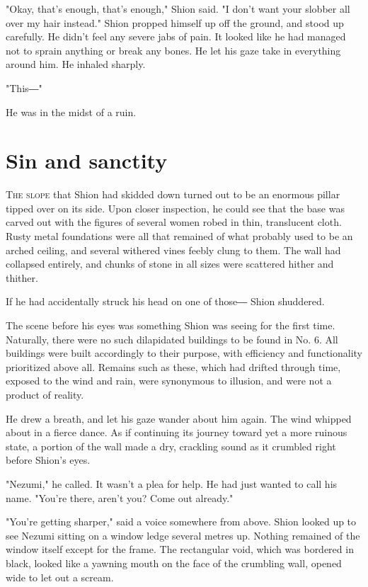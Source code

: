 "Okay, that's enough, that's enough," Shion said. "I don't want your
slobber all over my hair instead." Shion propped himself up off the
ground, and stood up carefully. He didn't feel any severe jabs of pain.
It looked like he had managed not to sprain anything or break any bones.
He let his gaze take in everything around him. He inhaled sharply.

"This―"

He was in the midst of a ruin.

\chapter{Sin and sanctity}


\lettrine{T}{he slope} that Shion had skidded down turned out to be an enormous
pillar tipped over on its side. Upon closer inspection, he could see
that the base was carved out with the figures of several women robed in
thin, translucent cloth. Rusty metal foundations were all that remained
of what probably used to be an arched ceiling, and several withered
vines feebly clung to them. The wall had collapsed entirely, and chunks
of stone in all sizes were scattered hither and thither.

If he had accidentally struck his head on one of those― Shion shuddered.

The scene before his eyes was something Shion was seeing for the first
time. Naturally, there were no such dilapidated buildings to be found in
No. 6. All buildings were built accordingly to their purpose, with
efficiency and functionality prioritized above all. Remains such as
these, which had drifted through time, exposed to the wind and rain,
were synonymous to illusion, and were not a product of reality.

He drew a breath, and let his gaze wander about him again. The wind
whipped about in a fierce dance. As if continuing its journey toward yet
a more ruinous state, a portion of the wall made a dry, crackling sound
as it crumbled right before Shion's eyes.

"Nezumi," he called. It wasn't a plea for help. He had just wanted to
call his name. "You're there, aren't you? Come out already."

"You're getting sharper," said a voice somewhere from above. Shion
looked up to see Nezumi sitting on a window ledge several metres up.
Nothing remained of the window itself except for the frame. The
rectangular void, which was bordered in black, looked like a yawning
mouth on the face of the crumbling wall, opened wide to let out a
scream.

